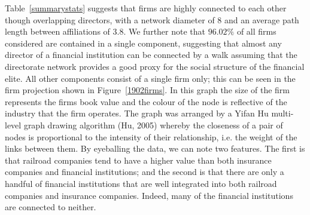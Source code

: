 \begin{table}[t]
\caption{Summary statistics of New York directorate network in 1902.}
\label{summarystats}
\end{table}

Table~\ref{summarystats} suggests that firms are highly connected to each other though overlapping directors, with a network diameter of $8$ and an average path length between affiliations of $3.8$. We further note that $96.02\%$ of all firms considered are contained in a single component, suggesting that almost any director of a financial institution can be connected by a walk assuming that the directorate network provides a good proxy for the social structure of the financial elite. All other components consist of a single firm only; this can be seen in the firm projection shown in Figure~\ref{1902firms}. In this graph the size of the firm represents the firms book value and the colour of the node is reflective of the industry that the firm operates. The graph was arranged by a Yifan Hu multi-level graph drawing algorithm (Hu, 2005) whereby the closeness of a pair of nodes is proportional to the intensity of their relationship, i.e. the weight of the links between them. By eyeballing the data, we can note two features. The first is that railroad companies tend to have a higher value than both insurance companies and financial institutions; and the second is that there are only a handful of financial institutions that are well integrated into both railroad companies and insurance companies. Indeed, many of the financial institutions are connected to neither.

